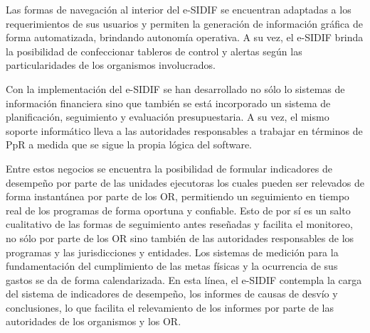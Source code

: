 Las formas de navegación al interior del e-SIDIF se encuentran adaptadas a los requerimientos de sus usuarios y permiten la generación de información gráfica de forma automatizada, brindando autonomía operativa. A su vez, el e-SIDIF brinda la posibilidad de confeccionar tableros de control y alertas según las particularidades de los organismos involucrados.

Con la implementación del e-SIDIF se han desarrollado no sólo lo sistemas de información financiera sino que también se está incorporado un sistema de planificación, seguimiento y evaluación presupuestaria. A su vez, el mismo soporte informático lleva a las autoridades responsables a trabajar en términos de PpR a medida que se sigue la propia lógica del software.

Entre estos negocios se encuentra la posibilidad de formular indicadores de desempeño por parte de las unidades ejecutoras los cuales pueden ser relevados de forma instantánea por parte de los OR, permitiendo un seguimiento en tiempo real de los programas de forma oportuna y confiable. Esto de por sí es un salto cualitativo de las formas de seguimiento antes reseñadas y facilita el monitoreo, no sólo por parte de los OR sino también de las autoridades responsables de los programas y las jurisdicciones y entidades. 
Los sistemas de medición para la fundamentación del cumplimiento de las metas físicas y la ocurrencia de sus gastos se da de forma calendarizada. En esta línea, el e-SIDIF contempla la carga del sistema de indicadores de desempeño, los informes de causas de desvío y conclusiones, lo que facilita el relevamiento de los informes por parte de las autoridades de los organismos y los OR.

